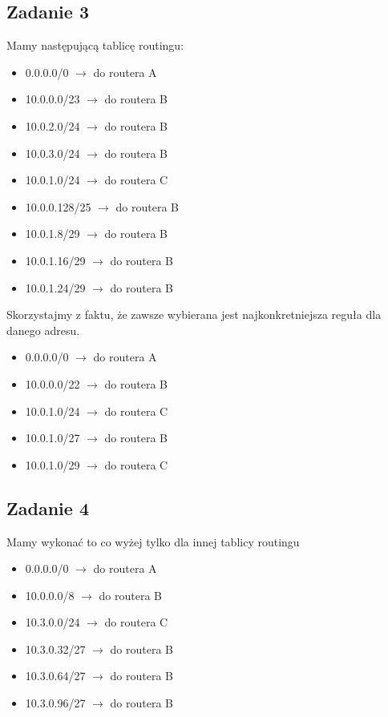 \documentclass[a4paper]{article}
\begin{document}
\subsection*{Zadanie 3}
Mamy następującą tablicę routingu:
\begin{itemize}
\item 0.0.0.0/0 $\rightarrow$ do routera A
\item 10.0.0.0/23 $\rightarrow$ do routera B
\item 10.0.2.0/24 $\rightarrow$ do routera B
\item 10.0.3.0/24 $\rightarrow$ do routera B
\item 10.0.1.0/24 $\rightarrow$ do routera C
\item 10.0.0.128/25 $\rightarrow$ do routera B
\item 10.0.1.8/29 $\rightarrow$ do routera B
\item 10.0.1.16/29 $\rightarrow$ do routera B
\item 10.0.1.24/29 $\rightarrow$ do routera B
\end{itemize}
Skorzystajmy z faktu, że zawsze wybierana jest najkonkretniejsza reguła dla danego adresu.
\begin{itemize}
\item 0.0.0.0/0 $\rightarrow$ do routera A
\item 10.0.0.0/22 $\rightarrow$ do routera B
\item 10.0.1.0/24 $\rightarrow$ do routera C
\item 10.0.1.0/27 $\rightarrow$ do routera B
\item 10.0.1.0/29 $\rightarrow$ do routera C
\end{itemize}

\clearpage

\subsection*{Zadanie 4}
Mamy wykonać to co wyżej tylko dla innej tablicy routingu

\begin{itemize}
\item 0.0.0.0/0 $\rightarrow$ do routera A
\item 10.0.0.0/8 $\rightarrow$ do routera B
\item 10.3.0.0/24 $\rightarrow$ do routera C
\item 10.3.0.32/27 $\rightarrow$ do routera B
\item 10.3.0.64/27 $\rightarrow$ do routera B
\item 10.3.0.96/27 $\rightarrow$ do routera B
\end{itemize}
\end{document}
